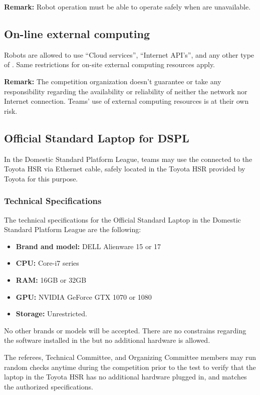 \noindent \textbf{Remark:} Robot operation must be able to operate safely when  are unavailable.



\subsection{On-line external computing}
\label{rule:robot_external_computing_online}
Robots are allowed to use \enquote{Cloud services}, \enquote{Internet API's}, and any other type of .
Same restrictions for on-site external computing resources apply.

\noindent \textbf{Remark:} The competition organization doesn't guarantee or take any responsibility regarding the availability or reliability of neither the network nor Internet connection.
Teams' use of external computing resources is at their own risk.



\subsection{Official Standard Laptop for DSPL}
\label{rule:osl_dspl}

In the Domestic Standard Platform League, teams may use the  connected to the Toyota HSR via Ethernet cable, safely located in the Toyota HSR  provided by Toyota for this purpose.

\subsubsection{Technical Specifications}
The technical specifications for the Official Standard Laptop in the Domestic Standard Platform League are the following:


 \begin{itemize}
  \item \textbf{Brand and model:} DELL Alienware 15 or 17
  \item \textbf{CPU:} Core-i7 series
  \item \textbf{RAM:} 16GB or 32GB
  \item \textbf{GPU:} NVIDIA GeForce GTX 1070 or 1080
  \item \textbf{Storage:} Unrestricted.
\end{itemize}

No other brands or models will be accepted. There are no constrains regarding the software installed in the  but no additional hardware is allowed.

The referees, Technical Committee, and Organizing Committee members may run random checks anytime during the competition prior to the test to verify that the laptop in the Toyota HSR  has no additional hardware plugged in, and matches the authorized specifications.


